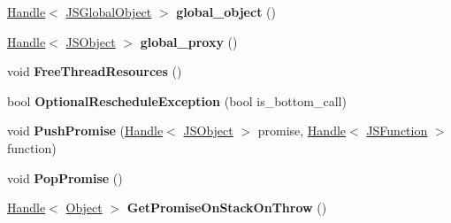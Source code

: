 \begin{DoxyCompactItemize}
\item 
\hyperlink{classv8_1_1internal_1_1_handle}{Handle}$<$ \hyperlink{classv8_1_1internal_1_1_j_s_global_object}{J\+S\+Global\+Object} $>$ {\bfseries global\+\_\+object} ()\hypertarget{classv8_1_1internal_1_1_isolate_a02fd172ef4a5caf9b5ce7d9794f79510}{}\label{classv8_1_1internal_1_1_isolate_a02fd172ef4a5caf9b5ce7d9794f79510}

\item 
\hyperlink{classv8_1_1internal_1_1_handle}{Handle}$<$ \hyperlink{classv8_1_1internal_1_1_j_s_object}{J\+S\+Object} $>$ {\bfseries global\+\_\+proxy} ()\hypertarget{classv8_1_1internal_1_1_isolate_a53938a796d056ccec2ce60d60448228c}{}\label{classv8_1_1internal_1_1_isolate_a53938a796d056ccec2ce60d60448228c}

\item 
void {\bfseries Free\+Thread\+Resources} ()\hypertarget{classv8_1_1internal_1_1_isolate_a858345eefd66c1d3cc41334b6df8dae9}{}\label{classv8_1_1internal_1_1_isolate_a858345eefd66c1d3cc41334b6df8dae9}

\item 
bool {\bfseries Optional\+Reschedule\+Exception} (bool is\+\_\+bottom\+\_\+call)\hypertarget{classv8_1_1internal_1_1_isolate_af1ebc122bf08aa361a5d73c0ea1b441d}{}\label{classv8_1_1internal_1_1_isolate_af1ebc122bf08aa361a5d73c0ea1b441d}

\item 
void {\bfseries Push\+Promise} (\hyperlink{classv8_1_1internal_1_1_handle}{Handle}$<$ \hyperlink{classv8_1_1internal_1_1_j_s_object}{J\+S\+Object} $>$ promise, \hyperlink{classv8_1_1internal_1_1_handle}{Handle}$<$ \hyperlink{classv8_1_1internal_1_1_j_s_function}{J\+S\+Function} $>$ function)\hypertarget{classv8_1_1internal_1_1_isolate_a0045157077c3746b50b6be9f1000c027}{}\label{classv8_1_1internal_1_1_isolate_a0045157077c3746b50b6be9f1000c027}

\item 
void {\bfseries Pop\+Promise} ()\hypertarget{classv8_1_1internal_1_1_isolate_a091efbd9fc9e16297eba62a6bb0ffb78}{}\label{classv8_1_1internal_1_1_isolate_a091efbd9fc9e16297eba62a6bb0ffb78}

\item 
\hyperlink{classv8_1_1internal_1_1_handle}{Handle}$<$ \hyperlink{classv8_1_1internal_1_1_object}{Object} $>$ {\bfseries Get\+Promise\+On\+Stack\+On\+Throw} ()\hypertarget{classv8_1_1internal_1_1_isolate_abe39e36b24243997a2de11120d916efc}{}\label{classv8_1_1internal_1_1_isolate_abe39e36b24243997a2de11120d916efc}


\end{DoxyCompactItemize}
